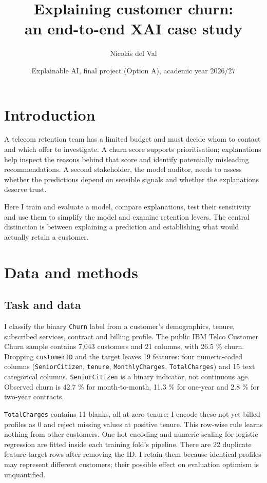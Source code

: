 \documentclass[10pt,a4paper]{article}
\title{\vspace{-1.5em}\Large\bfseries Explaining customer churn:\\an end-to-end XAI case study}
\author{Nicolás del Val}
\date{\small Explainable AI, final project (Option A), academic year 2026/27}
\begin{document}
\maketitle
\vspace{-1em}

\section{Introduction}\label{introduction}

A telecom retention team has a limited budget and must decide whom to
contact and which offer to investigate. A churn score supports
prioritisation; explanations help inspect the reasons behind that score
and identify potentially misleading recommendations. A second
stakeholder, the model auditor, needs to assess whether the predictions
depend on sensible signals and whether the explanations deserve trust.

Here I train and evaluate a model, compare explanations, test their
sensitivity and use them to simplify the model and examine retention
levers. The central
distinction is between explaining a prediction and establishing what
would actually retain a customer.

\section{Data and methods}\label{data-and-methods}

\subsection{Task and data}\label{task-and-data}

I classify the binary \texttt{Churn} label from a customer's
demographics, tenure, subscribed services, contract and billing profile.
The public IBM Telco Customer Churn sample \cite{ibm} contains 7,043
customers and 21 columns, with 26.5 \% churn. Dropping
\texttt{customerID} and the target leaves 19 features: four
numeric-coded columns (\texttt{SeniorCitizen}, \texttt{tenure},
\texttt{MonthlyCharges}, \texttt{TotalCharges}) and 15 text categorical
columns. \texttt{SeniorCitizen} is a binary indicator, not continuous
age. Observed churn is 42.7 \% for month-to-month, 11.3 \% for one-year
and 2.8 \% for two-year contracts.

\texttt{TotalCharges} contains 11 blanks, all at zero tenure; I encode
these not-yet-billed profiles as 0 and reject missing values at positive
tenure. This row-wise rule learns nothing from other customers. One-hot
encoding and numeric scaling for logistic regression are fitted inside
each training fold's pipeline. There are 22 duplicate feature-target
rows after removing the ID. I retain them because identical profiles
may represent different customers; their possible effect on evaluation
optimism is unquantified.
\end{document}
